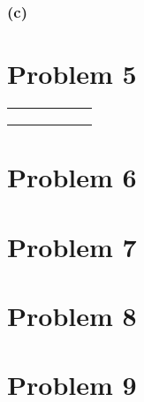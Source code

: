 \documentclass{article} %
\begin{document}
            \subsubsection*{(c)}

    \section*{Problem 5}

    \begin{center}
        \begin{tabular}{ |l|c|c|c|c|c| } 
         \hline
          &  &  &  &  &  \\ %
         \hline
          &  &  &  &  & \\ 
         \hline
          &  &  &  &  &  \\ 
         \hline
            &  &  &  &  &  \\ 
         \hline
        \end{tabular}
    \end{center}

    \section*{Problem 6}


    \section*{Problem 7}
    

    \section*{Problem 8}

    \section*{Problem 9}
\end{document}

